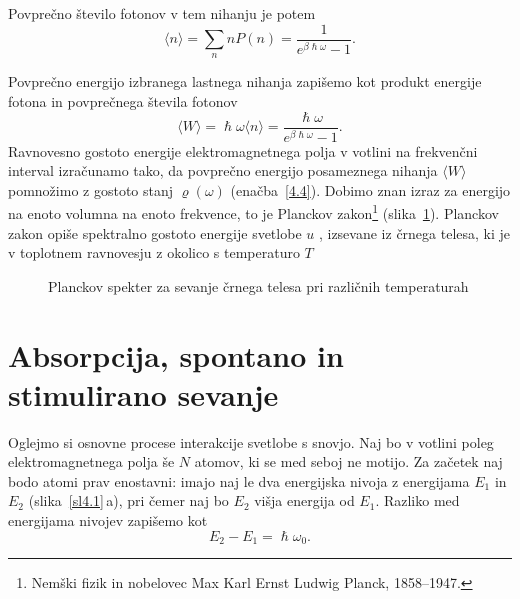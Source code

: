 Povprečno število fotonov v tem nihanju je potem 
\begin{equation}
\langle n\rangle =\sum_{n}n P(n)=\frac{1}{e^{\beta\hslash\omega}-1}.
\label{4.13}
\end{equation}

Povprečno energijo izbranega lastnega nihanja zapišemo kot produkt energije fotona in 
povprečnega števila fotonov
\begin{equation}
\langle W\rangle = \hslash \omega \langle n \rangle
= \frac{\hslash \omega}{e^{\beta\hslash\omega}-1}.
\end{equation}
Ravnovesno gostoto energije elektromagnetnega polja v votlini na
frekvenčni interval izračunamo tako, da povprečno energijo posameznega
nihanja $\langle W \rangle$ pomnožimo z gostoto stanj $\varrho (\omega)$ 
(enačba~\ref{4.4}). Dobimo znan izraz za energijo na enoto volumna na enoto frekvence, 
to je Planckov zakon\footnote{Nemški fizik in nobelovec 
Max Karl Ernst Ludwig Planck, 1858--1947.} (slika~\ref{fig:Planck}).
Planckov zakon opiše spektralno gostoto energije svetlobe $u$ 
, izsevane iz 
črnega telesa, ki je v toplotnem ravnovesju z 
okolico s temperaturo $T$

\begin{figure}[h]
\centering
\def\svgwidth{100truemm} 

\caption{Planckov spekter za sevanje črnega telesa pri različnih temperaturah}
\label{fig:Planck}
\end{figure}

\section{Absorpcija, spontano in stimulirano sevanje}
\label{chap:ASSS}
Oglejmo si osnovne procese interakcije svetlobe s snovjo. Naj
bo v votlini poleg elektro\-mag\-net\-nega polja še $N$ atomov, ki se med
seboj ne motijo. Za začetek naj bodo atomi prav enostavni:
imajo naj le dva energijska nivoja z energijama $E_{1}$ in $E_{2}$ (slika~\ref{sl4.1}\,a),
pri čemer naj bo $E_2$ višja energija od $E_1$. Razliko med energijama nivojev zapišemo kot 
\begin{equation}
 E_2 - E_1 = \hslash \omega_0.
\end{equation}


